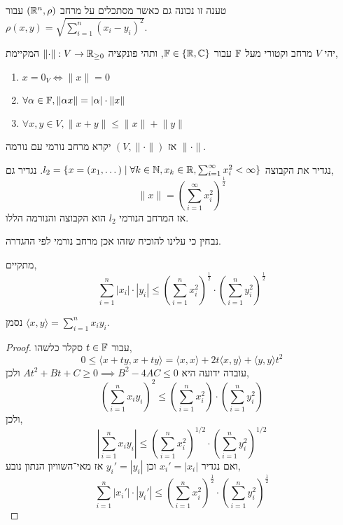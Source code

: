 \begin{remark}
	טענה זו נכונה גם כאשר מסתכלים על מרחב $(\mathbb{R}^n, \rho)$ עבור $\rho(x, y) = \sqrt{\sum_{i = 1}^{n} {(x_i - y_i)}^2}$.
\end{remark}
\begin{definition}
	יהי $V$ מרחב וקטורי מעל $\mathbb{F}$ עבור $\mathbb{F} \in \{ \mathbb{R}, \mathbb{C} \}$, ותהי פונקציה $\lVert \cdot \rVert : V \to \mathbb{R}_{\ge0}$ המקיימת,
	\begin{enumerate}
		\item $x = 0_V \iff \lVert x \rVert = 0$
		\item $\forall \alpha \in \mathbb{F}, \lVert \alpha x \rVert = |\alpha| \cdot \lVert x \rVert$
		\item $\forall x, y \in V, \lVert x + y \rVert \le \lVert x \rVert + \lVert y \rVert$
	\end{enumerate}
	אז $(V, \lVert \cdot \rVert)$ יקרא מרחב נורמי עם נורמה $\lVert \cdot \rVert$.
\end{definition}
\begin{definition}[מרחב l2]
	נגדיר את הקבוצה $l_2 = \{ x = (x_1, \dots) \mid \forall k \in \mathbb{N}, x_k \in \mathbb{R}, \sum_{i = 1}^{\infty} x_i^2 < \infty \}$.
	נגדיר גם,
	\[
		\lVert x \rVert = {\left(\sum_{i = 1}^{\infty} x_i^2\right)}^{\frac{1}{2}}
	\]
	אז המרחב הנורמי $l_2$ הוא הקבוצה והנורמה הללו.
\end{definition}
נבחין כי עלינו להוכיח שזהו אכן מרחב נורמי לפי ההגדרה.
\begin{theorem}
	מתקיים,
	\[
		\sum_{i = 1}^{n} |x_i| \cdot |y_i|
		\le {\left( \sum_{i = 1}^{n} x_i^2 \right)}^{\frac{1}{2}} \cdot {\left( \sum_{i = 1}^{n} y_i^2 \right)}^{\frac{1}{2}}
	\]
\end{theorem}
\begin{notation}
	נסמן $\langle x, y \rangle = \sum_{i = 1}^{n}  x_i y_i$.
\end{notation}
\begin{proof}
	עבור $t \in \mathbb{F}$ סקלר כלשהו,
	\[
		0
		\le \langle x + ty, x + ty \rangle
		= \langle x, x \rangle + 2t \langle x, y \rangle + \langle y, y \rangle t^2
	\]
	עובדה ידועה היא $At^2 + Bt + C \ge 0 \implies B^2 - 4AC \le 0$ ולכן,
	\[
		{\left( \sum_{i = 1}^{n} x_i y_i \right)}^2
		\le {\left( \sum_{i = 1}^{n} x_i^2 \right)} \cdot {\left( \sum_{i = 1}^{n} y_i^2 \right)}
	\]
	ולכן,
	\[
		\left\lvert \sum_{i = 1}^{n} x_i y_i \right\rvert
		\le {\left( \sum_{i = 1}^{n} x_i^2 \right)}^{1/2} \cdot {\left( \sum_{i = 1}^{n} y_i^2 \right)}^{1/2}
	\]
	ואם נגדיר $x_i' = |x_i|$ וכן $y_i' = |y_i|$ אז מאי־השוויון הנתון נובע,
	\[
		\sum_{i = 1}^{n} |x_i'| \cdot |y_i'|
		\le {\left( \sum_{i = 1}^{n} x_i^2 \right)}^{\frac{1}{2}} \cdot {\left( \sum_{i = 1}^{n} y_i^2 \right)}^{\frac{1}{2}}
	\]
\end{proof}
